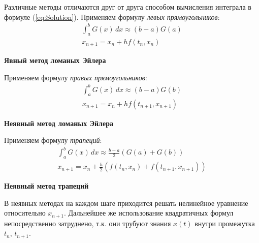 \documentclass[a4paper,11pt]{article}
\begin{document}
Различные методы отличаются друг от друга способом вычисления интеграла в формуле (\ref{eq:Solution}).
Применяем формулу \textit{левых прямоугольников}:
\begin{gather*}
  \int_a^b G(x)\,dx \approx (b-a)G(a) \\
  \boxed{x_{n+1} = x_n + hf(t_n, x_n)}
\end{gather*}
\begin{center}
  \textbf{\small{Явный метод ломаных Эйлера}}
\end{center}
Применяем формулу \textit{правых прямоугольников}:
\begin{gather*}
  \int_a^b G(x)\,dx \approx (b-a)G(b) \\
  \boxed{x_{n+1} = x_n + hf(t_{n+1}, x_{n+1})}
\end{gather*}
\begin{center}
  \textbf{\small{Неявный метод ломаных Эйлера}}
\end{center}
Применяем формулу \textit{трапеций}:
\begin{gather*}
  \int_a^b G(x)\,dx \approx \frac{b-a}{2}(G(a) + G(b)) \\
  \boxed{x_{n+1} = x_n + \frac{h}{2}(f(t_n, x_n) + f(t_{n+1}, x_{n+1}))}
\end{gather*}
\begin{center}
  \textbf{\small{Неявный метод трапеций}}
\end{center}
В неявных методах на каждом шаге приходится решать нелинейное уравнение относительно $x_{n+1}$. Дальнейшее же использование
квадратичных формул непосредственно затруднено, т.к. они трубуют знания $x(t)$ внутри промежутка $t_n,\, t_{n+1}$.
\end{document}
